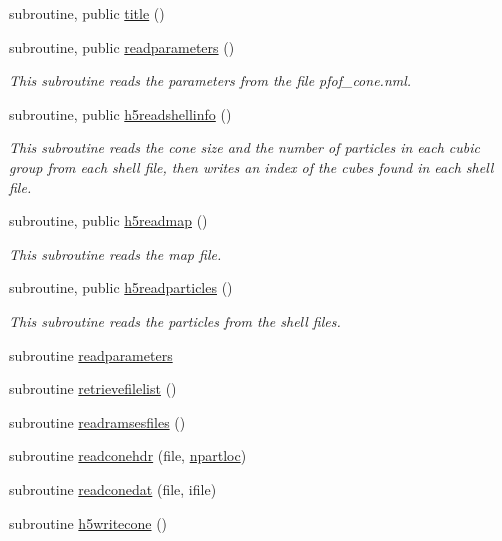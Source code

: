 \begin{DoxyCompactItemize}
subroutine, public \hyperlink{classmodio_a90c33edbc534da99fc29b95e36133d18}{title} ()
\item 
subroutine, public \hyperlink{classmodio_add45280540db1513b0ec12d80d94481d}{readparameters} ()
\begin{DoxyCompactList}\small\item\em This subroutine reads the parameters from the file pfof\-\_\-cone.\-nml. \end{DoxyCompactList}\item 
subroutine, public \hyperlink{classmodio_a39ae1a37db7810874544f24f5e481e75}{h5readshellinfo} ()
\begin{DoxyCompactList}\small\item\em This subroutine reads the cone size and the number of particles in each cubic group from each shell file, then writes an index of the cubes found in each shell file. \end{DoxyCompactList}\item 
subroutine, public \hyperlink{classmodio_ab1437ccb79bbe8815d8fbc76860c18d2}{h5readmap} ()
\begin{DoxyCompactList}\small\item\em This subroutine reads the map file. \end{DoxyCompactList}\item 
subroutine, public \hyperlink{classmodio_a7958a19d4d9ca80051c50762faa5da83}{h5readparticles} ()
\begin{DoxyCompactList}\small\item\em This subroutine reads the particles from the shell files. \end{DoxyCompactList}\item 
subroutine \hyperlink{classmodio_a3822b26d7d81e96e4c7e885466fd82e4}{readparameters}
\item 
subroutine \hyperlink{classmodio_a49a42a212fba0853ef61f4f3360e6cb8}{retrievefilelist} ()
\item 
subroutine \hyperlink{classmodio_a65b2a30853dd9ec7641c578cb220a3fe}{readramsesfiles} ()
\item 
subroutine \hyperlink{classmodio_ac8d9a9aea4bf8df27247c29c816df78c}{readconehdr} (file, \hyperlink{classmodio_a0bf1df6ff1e675aabce26f3d7289a700}{npartloc})
\item 
subroutine \hyperlink{classmodio_a15ba57a85caae734e0b917de58988acd}{readconedat} (file, ifile)
\item 
subroutine \hyperlink{classmodio_a756eae4b92791daadf54d68094c44c8b}{h5writecone} ()
\item 

\end{DoxyCompactItemize}
